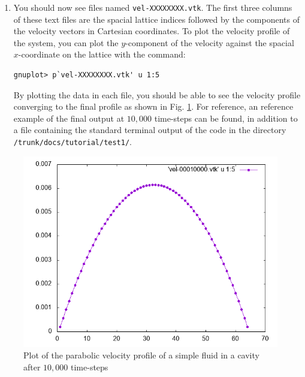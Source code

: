 \documentclass[11pt,twoside,a4paper]{article}
\begin{document}
\begin{enumerate}
\begin{enumerate}
\item \texttt{vel=1} for velocity post-processing. 
\end{enumerate}
\item You should now see files named \texttt{vel-XXXXXXXX.vtk}. The first three columns of these text files are the spacial lattice indices followed by the components of the velocity vectors in Cartesian coordinates. To plot the velocity profile of the system, you can plot the $y$-component of the velocity against the spacial $x$-coordinate on the lattice with the command:
\begin{lstlisting}
gnuplot> p`vel-XXXXXXXX.vtk' u 1:5
\end{lstlisting} 
By plotting the data in each file, you should be able to see the velocity profile converging to the final profile as shown in Fig. \ref{fig:velocityProfile}. For reference, an reference example of the final output at $10,000$ time-steps can be found, in addition to a file containing the standard terminal output of the code in the directory \texttt{/trunk/docs/tutorial/test1/}.
\end{enumerate} 


\begin{figure}[h]
\begin{center}
\includegraphics[width=0.6\linewidth]{velProf.png}
  \caption{Plot of the parabolic velocity profile of a simple fluid in a cavity after $10,000$ time-steps}
  \label{fig:velocityProfile}
  \end{center}
\end{figure}

%
\end{document}

